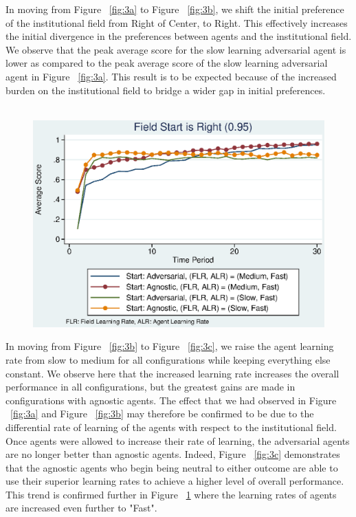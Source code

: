 \documentclass[12pt,letterpaper]{article}
\begin{document}
\noindent In moving from Figure ~\ref{fig:3a} to Figure ~\ref{fig:3b}, we shift the initial preference of the institutional field from Right of Center, to Right. This effectively increases the initial divergence in the preferences between agents and the institutional field. We observe that the peak average score for the slow learning adversarial agent is lower as compared to the peak average score of the slow learning adversarial agent in Figure ~\ref{fig:3a}. This result is to be expected because of the increased burden on the institutional field to bridge a wider gap in initial preferences.\\\\

\begin{figure}[h]
\begin{centering}
  \includegraphics[width=\textwidth]{frcmedium3d}
  \caption{}
  \label{fig:3d}
\end{centering}
\end{figure}

\noindent In moving from Figure ~\ref{fig:3b} to Figure ~\ref{fig:3c}, we raise the agent learning rate from slow to medium for all configurations while keeping everything else constant. We observe here that the increased learning rate increases the overall performance in all configurations, but the greatest gains are made in configurations with agnostic agents. The effect that we had observed in Figure ~\ref{fig:3a} and Figure ~\ref{fig:3b} may therefore be confirmed to be due to the differential rate of learning of the agents with respect to the institutional field. Once agents were allowed to increase their rate of learning, the adversarial agents are no longer better than agnostic agents. Indeed, Figure ~\ref{fig:3c} demonstrates that the agnostic agents who begin being neutral to either outcome are able to use their superior learning rates to achieve a higher level of overall performance. This trend is confirmed further in Figure ~\ref{fig:3d} where the learning rates of agents are increased even further to "Fast".\\\\
\end{document}
